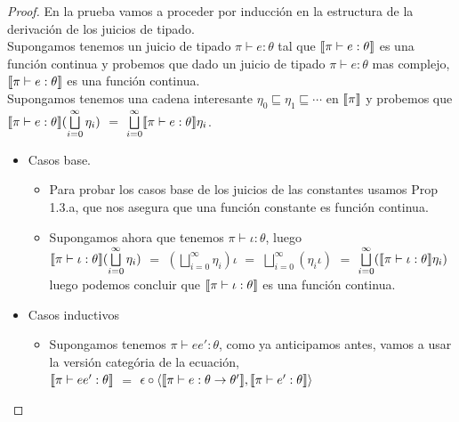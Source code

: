 \begin{proof}

En la prueba vamos a proceder por inducci\'on en la estructura de la derivaci\'on 
de los juicios de tipado.\\

Supongamos tenemos un juicio de tipado $\pi \vdash e : \theta$ tal que
$\llbracket \pi \vdash e : \theta \rrbracket$ es una funci\'on continua y probemos
que dado un juicio de tipado $\pi \vdash e : \theta$ mas complejo,
$\llbracket \pi \vdash e : \theta \rrbracket$ es una funci\'on continua.\\

Supongamos tenemos una cadena interesante
$\eta_0 \sqsubseteq \eta_1 \sqsubseteq \cdots$ en $\llbracket \pi \rrbracket$ y probemos
que $\llbracket \pi \vdash e : \theta \rrbracket(\bigsqcup\limits^{\infty}_{i=0} \eta_i)$
$=$ $\bigsqcup\limits^{\infty}_{i=0} \llbracket \pi \vdash e : \theta \rrbracket\eta_i$.

\begin{itemize}
\item Casos base.

\begin{itemize}
\item Para probar los casos base de los juicios de las constantes usamos Prop 1.3.a, 
que nos asegura que una funci\'on constante es funci\'on continua. 

\item Supongamos ahora que tenemos $\pi \vdash \iota : \theta$, luego \\

$\llbracket \pi \vdash \iota : \theta \rrbracket (\bigsqcup\limits^{\infty}_{i=0} \eta_i)$ $=$
$(\bigsqcup\limits^{\infty}_{i=0} \eta_i)\iota$ $=$
$\bigsqcup\limits^{\infty}_{i=0} (\eta_i \iota)$ $=$
$\bigsqcup\limits^{\infty}_{i=0} (\llbracket \pi \vdash \iota : \theta \rrbracket\eta_i)$\\

luego podemos concluir que $\llbracket \pi \vdash \iota : \theta \rrbracket$ es una funci\'on
continua.
\end{itemize}

\item Casos inductivos
\begin{itemize}

\item Supongamos tenemos $\pi \vdash ee' : \theta$, como ya anticipamos antes, vamos a
usar la versi\'on categ\'oria de la ecuaci\'on, \\

$\llbracket \pi \vdash ee' : \theta \rrbracket$ $=$
$\epsilon \circ \langle \llbracket \pi \vdash e : \theta \rightarrow \theta' \rrbracket
					     ,\llbracket \pi \vdash e' : \theta \rrbracket \rangle$\\


\end{itemize}
\end{itemize}
\end{proof}
